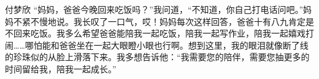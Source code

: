 {}\markdownRendererInterblockSeparator
{}付梦欣\markdownRendererInterblockSeparator
{}“妈妈，爸爸今晚回来吃饭吗？”我问道，“不知道，你自己打电话问吧。”妈妈不紧不慢地说。我长叹了一口气，哎！妈妈每次这样回答，爸爸十有八九肯定是不回来吃饭。我多么希望爸爸能陪我一起吃饭，陪我一起写作业，陪我一起嬉戏打闹……哪怕能和爸爸坐在一起大眼瞪小眼也行啊。想到这里，我的眼泪就像断了线的珍珠似的从脸上滑落下来。我多想告诉他：“我需要您的陪伴，需要您抽更多的时间留给我，陪我一起成长。”\relax